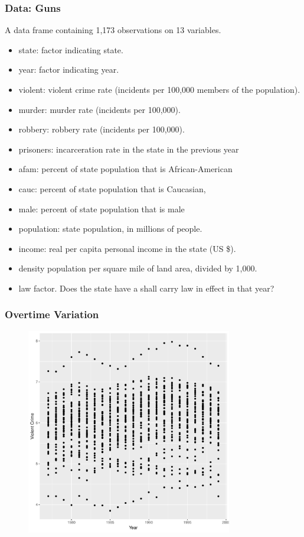 \documentclass{beamer}
\newcommand{\1}{\mathbb{1}}
\begin{document}
\begin{frame}\frametitle{Data: Guns}
A data frame containing 1,173 observations on 13 variables.
\begin{itemize}
 \item state: factor indicating state.
\item year: factor indicating year.
\item violent: violent crime rate (incidents per 100,000 members of the population).
\item murder: murder rate (incidents per 100,000).
\item robbery: robbery rate (incidents per 100,000).
\item prisoners: incarceration rate in the state in the previous year 
\item afam: percent of state population that is African-American
\item cauc: percent of state population that is Caucasian, \item male: percent of state population that is male
\item population: state population, in millions of people.
\item income: real per capita personal income in the state (US \$).
\item density population per square mile of land area, divided by 1,000.
\item law factor. Does the state have a shall carry law in effect in that year?
\end{itemize}
\end{frame}

\begin{frame}\frametitle{Overtime Variation}
\begin{figure}
\includegraphics[width = 9cm]{plot/Time}
\end{figure}
\end{frame}
\end{document}
